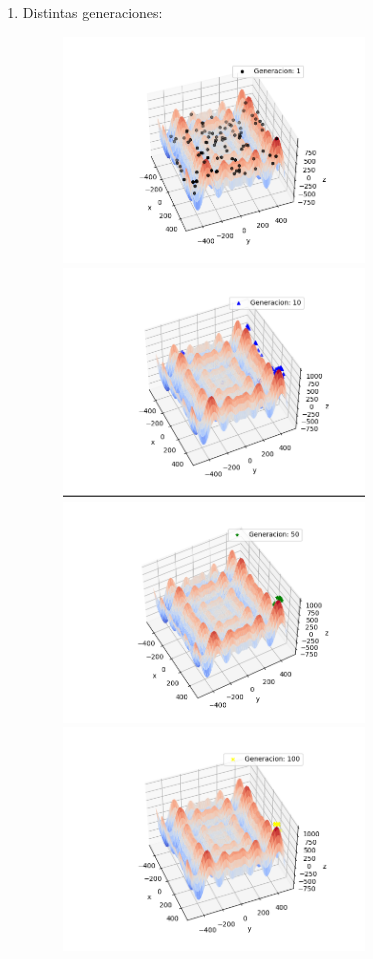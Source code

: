 \documentclass[11pt,letterpaper]{article}
\begin{document}
\begin{enumerate}[label=\alph*)]
\begin{enumerate}[label=\arabic*.]
            \item Distintas generaciones:
            \begin{figure}[H]
                \centering
                \includegraphics[width=8cm]{images/gen001.png}
                \includegraphics[width=8cm]{images/gen010.png}
                \includegraphics[width=8cm]{images/gen050.png}
                \includegraphics[width=8cm]{images/gen100.png}
                \label{fig:gen-n}
            \end{figure}
        \end{enumerate}


\end{enumerate}
\end{document}
